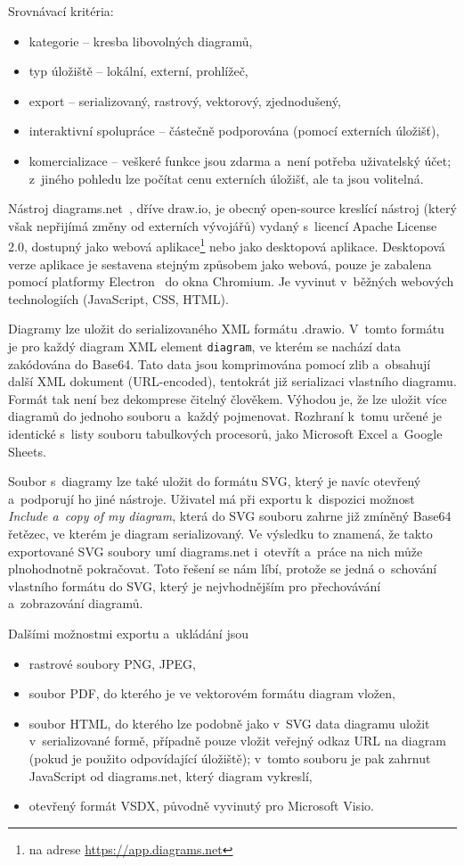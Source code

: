 Srovnávací kritéria:
\begin{itemize}
  \item kategorie -- kresba libovolných diagramů,
  \item typ úložiště -- lokální, externí, prohlížeč,
  \item export -- serializovaný, rastrový, vektorový, zjednodušený,
  \item interaktivní spolupráce -- částečně podporována (pomocí externích úložišť),
  \item komercializace -- veškeré funkce jsou zdarma a~není potřeba uživatelský
  účet; z~jiného pohledu lze počítat cenu externích úložišť, ale ta jsou
  volitelná.
\end{itemize}

Nástroj diagrams.net~\cite{diagramsnet21}, dříve draw.io, je obecný open-source
kreslící nástroj (který však nepřijímá změny od externích vývojářů) vydaný
s~licencí Apache License 2.0, dostupný jako webová aplikace\footnote{na adrese
\url{https://app.diagrams.net}} nebo jako desktopová aplikace. Desktopová verze
aplikace je sestavena stejným způsobem jako webová, pouze je zabalena pomocí
platformy Electron~\cite{electron21}  do okna Chromium. Je vyvinut v~běžných
we\-bo\-vých tech\-no\-lo\-gi\-ích (Java\-Script, CSS, HTML).

Diagramy lze uložit do serializovaného XML formátu .drawio. V~tomto formátu je
pro každý diagram XML element \texttt{diagram}, ve kterém se nachází data
zakódována do Base64. Tato data jsou komprimována pomocí zlib a~obsahují další
XML dokument (URL-encoded), tentokrát již serializaci vlastního diagramu. Formát
tak není bez dekomprese čitelný člověkem. Výhodou je, že lze uložit více
diagramů do jednoho souboru a~každý pojmenovat. Rozhraní k~tomu určené je
identické s~listy souboru tabulkových procesorů, jako Microsoft Excel a~Google
Sheets.

Soubor s~diagramy lze také uložit do formátu SVG, který je navíc otevřený
a~podporují ho jiné nástroje. Uživatel má při exportu k~dispozici možnost
\textit{Include a~copy of my diagram}, která do SVG souboru zahrne již zmíněný
Base64 řetězec, ve kterém je diagram serializovaný. Ve výsledku to znamená, že
takto exportované SVG soubory umí diagrams.net i~otevřít a~práce na nich může
plnohodnotně pokračovat. Toto řešení se nám líbí, protože se jedná o~schování
vlastního formátu do SVG, který je nejvhodnějším pro přechovávání a~zobrazování
diagramů.

Dalšími možnostmi exportu a~ukládání jsou
\begin{itemize}
  \item rastrové soubory PNG, JPEG,
  \item soubor PDF, do kterého je ve vektorovém formátu diagram vložen,
  \item soubor HTML, do kterého lze podobně jako v~SVG data diagramu uložit
v~serializované formě, případně pouze vložit veřejný odkaz URL na diagram (pokud
  je použito odpovídající úložiště); v~tomto souboru je pak zahrnut JavaScript
  od diagrams.net, který diagram vykreslí,
  \item otevřený formát VSDX, původně vyvinutý pro Microsoft Visio.
\end{itemize}

